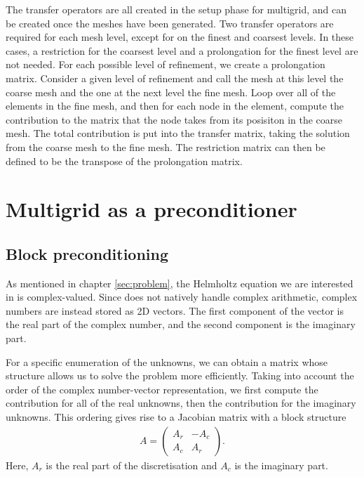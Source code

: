 The transfer operators are all created in the setup phase for multigrid, and can be created once the meshes have been generated.
Two transfer operators are required for each mesh level, except for on the finest and coarsest levels.
In these cases, a restriction for the coarsest level and a prolongation for the finest level are not needed.
For each possible level of refinement, we create a prolongation matrix.
Consider a given level of refinement and call the mesh at this level the coarse mesh and the one at the next level the fine mesh.
Loop over all of the elements in the fine mesh, and then for each node in the element, compute the contribution to the matrix that the node takes from its posisiton in the coarse mesh.
The total contribution is put into the transfer matrix, taking the solution from the coarse mesh to the fine mesh.
The restriction matrix can then be defined to be the transpose of the prolongation matrix.






\section{Multigrid as a preconditioner}
\label{sec:precond}

\subsection{Block preconditioning}


As mentioned in chapter \ref{sec:problem}, the Helmholtz equation we are interested in is complex-valued.
Since \oomph does not natively handle complex arithmetic, complex numbers are instead stored as 2D vectors.
The first component of the vector is the real part of the complex number, and the second component is the imaginary part.

For a specific enumeration of the unknowns, we can obtain a matrix whose structure allows us to solve the problem more efficiently.
Taking into account the order of the \oomph complex number-vector representation, we first compute the contribution for all of the real unknowns, then the contribution for the imaginary unknowns.
This ordering gives rise to a Jacobian matrix with a block structure
\begin{align}
	A = \begin{pmatrix}
		A_r & -A_c \\ A_c & A_r
	\end{pmatrix}.
\end{align}
Here, $A_r$ is the real part of the discretisation and $A_c$ is the imaginary part.

